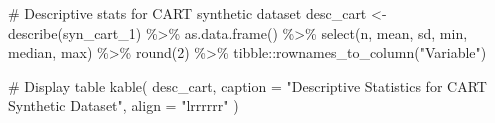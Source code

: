 \documentclass[
  letterpaper,
  DIV=11,
  numbers=noendperiod]{scrartcl}
\newenvironment{Shaded}{\begin{snugshade}}{\end{snugshade}}
\newcommand{\AttributeTok}[1]{\textcolor[rgb]{0.40,0.45,0.13}{#1}}
\newcommand{\CommentTok}[1]{\textcolor[rgb]{0.37,0.37,0.37}{#1}}
\newcommand{\DecValTok}[1]{\textcolor[rgb]{0.68,0.00,0.00}{#1}}
\newcommand{\FunctionTok}[1]{\textcolor[rgb]{0.28,0.35,0.67}{#1}}
\newcommand{\NormalTok}[1]{\textcolor[rgb]{0.00,0.23,0.31}{#1}}
\newcommand{\OtherTok}[1]{\textcolor[rgb]{0.00,0.23,0.31}{#1}}
\newcommand{\SpecialCharTok}[1]{\textcolor[rgb]{0.37,0.37,0.37}{#1}}
\newcommand{\StringTok}[1]{\textcolor[rgb]{0.13,0.47,0.30}{#1}}
\begin{document}
\begin{Shaded}
\begin{Highlighting}[]
\CommentTok{\# Descriptive stats for CART synthetic dataset}
\NormalTok{desc\_cart }\OtherTok{\textless{}{-}} \FunctionTok{describe}\NormalTok{(syn\_cart\_1) }\SpecialCharTok{\%\textgreater{}\%}
  \FunctionTok{as.data.frame}\NormalTok{() }\SpecialCharTok{\%\textgreater{}\%}
  \FunctionTok{select}\NormalTok{(n, mean, sd, min, median, max) }\SpecialCharTok{\%\textgreater{}\%}
  \FunctionTok{round}\NormalTok{(}\DecValTok{2}\NormalTok{) }\SpecialCharTok{\%\textgreater{}\%}
\NormalTok{  tibble}\SpecialCharTok{::}\FunctionTok{rownames\_to\_column}\NormalTok{(}\StringTok{"Variable"}\NormalTok{)}

\CommentTok{\# Display table}
\FunctionTok{kable}\NormalTok{(}
\NormalTok{  desc\_cart,}
  \AttributeTok{caption =} \StringTok{"Descriptive Statistics for CART Synthetic Dataset"}\NormalTok{,}
  \AttributeTok{align =} \StringTok{"lrrrrrr"}
\NormalTok{)}
\end{Highlighting}
\end{Shaded}
\end{document}

